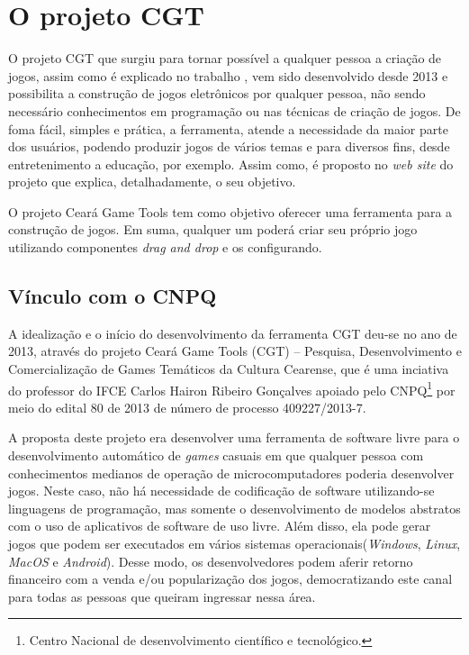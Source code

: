 \documentclass[12pt,twoside,openright,a4paper,english,brazil,sumario=tradicional]{abntex2}
\begin{document}
\section{O projeto CGT}
O projeto CGT que surgiu para tornar possível a qualquer pessoa a criação de jogos, assim como é explicado no trabalho \cite{monografia:aquino}, vem sido desenvolvido desde 2013 e possibilita a construção de jogos eletrônicos por qualquer pessoa, não sendo necessário conhecimentos em programação ou nas técnicas de criação de jogos. De foma fácil, simples e prática, a ferramenta, atende a necessidade da maior parte dos usuários, podendo produzir jogos de vários temas e para diversos fins, desde entretenimento a educação, por exemplo. Assim como, é proposto no \emph{web site} do projeto que explica, detalhadamente, o seu objetivo.
\begin{citacao}
   O projeto Ceará Game Tools tem como objetivo oferecer uma ferramenta para a construção de jogos. Em suma, qualquer um poderá criar seu próprio jogo utilizando componentes \emph{drag and drop} e os configurando. \cite{website:projeto-cgt}
\end{citacao}
\subsection{Vínculo com o CNPQ}
A idealização e o início do desenvolvimento da ferramenta CGT deu-se no ano de 2013, através do projeto Ceará Game Tools (CGT) – Pesquisa, Desenvolvimento e Comercialização de Games Temáticos da Cultura Cearense, que é uma inciativa do professor do IFCE Carlos Hairon Ribeiro Gonçalves  apoiado pelo CNPQ\footnote{Centro Nacional de desenvolvimento científico e tecnológico.} por meio do edital 80 de 2013 de número de processo 409227/2013-7.

A proposta deste projeto era desenvolver uma ferramenta de software livre para o desenvolvimento automático de \emph{games} casuais em que qualquer pessoa com conhecimentos medianos de operação de microcomputadores poderia desenvolver jogos. Neste caso, não há necessidade de codificação de software utilizando-se linguagens de programação, mas somente o desenvolvimento de modelos abstratos com o uso de aplicativos de software de uso livre. Além disso, ela pode gerar jogos que podem ser executados em vários sistemas operacionais(\emph{Windows}, \emph{Linux}, \emph{MacOS} e \emph{Android}). Desse modo, os desenvolvedores podem aferir retorno financeiro com a venda e/ou popularização dos jogos, democratizando este canal para todas as pessoas que queiram ingressar nessa área.
\end{document}
